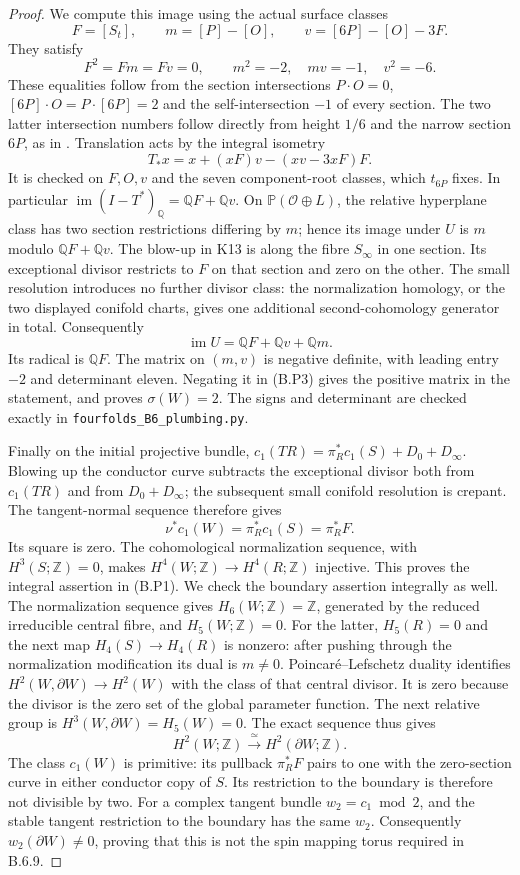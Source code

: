 \begin{proof}
We compute this image using the actual surface classes
\[
 F=[S_t],\qquad m=[P]-[O],\qquad
 v=[6P]-[O]-3F.
\]
They satisfy
\[
 F^2=Fm=Fv=0,
 \qquad m^2=-2,\quad mv=-1,\quad v^2=-6.
 \tag{B.P4}
\]
These equalities follow from the section intersections
$P\cdot O=0$, $[6P]\cdot O=P\cdot[6P]=2$ and the
self-intersection $-1$ of every section.  The two latter
intersection numbers follow directly from height $1/6$ and
the narrow section $6P$, as in \cite[Lemma 2.1]{mapsEngel}.
Translation acts by the integral isometry
\[
 T_*x=x+(xF)v-(xv-3xF)F.
\]
It is checked on $F,O,v$ and the seven component-root classes,
which $t_{6P}$ fixes.  In particular
$\operatorname{im}(I-T^*)_{\mathbb Q}=\mathbb QF+\mathbb Qv$.
On $\mathbb P(\mathcal O\oplus L)$, the relative hyperplane
class has two section restrictions differing by $m$; hence its
image under $U$ is $m$ modulo $\mathbb QF+\mathbb Qv$.
The blow-up in K13 is along the fibre $S_\infty$ in one section.
Its exceptional divisor restricts to $F$ on that section and zero
on the other.  The small resolution introduces no further divisor
class: the normalization homology, or the two displayed conifold
charts, gives one additional second-cohomology generator in total.
Consequently
\[
 \operatorname{im}U=\mathbb QF+\mathbb Qv+\mathbb Qm.
\]
Its radical is $\mathbb QF$.  The matrix on $(m,v)$ is negative
definite, with leading entry $-2$ and determinant eleven.
Negating it in (B.P3) gives the positive matrix in the statement,
and proves $\sigma(W)=2$.  The signs and determinant are checked
exactly in \texttt{fourfolds\_B6\_plumbing.py}.

Finally on the initial projective bundle,
$c_1(TR)=\pi_R^*c_1(S)+D_0+D_\infty$.
Blowing up the conductor curve subtracts the exceptional divisor
both from $c_1(TR)$ and from $D_0+D_\infty$; the subsequent small
conifold resolution is crepant.  The tangent-normal sequence
therefore gives
\[
 \nu^*c_1(W)=\pi_R^*c_1(S)=\pi_R^*F.
\]
Its square is zero.  The cohomological normalization sequence,
with $H^3(S;\mathbb Z)=0$, makes
$H^4(W;\mathbb Z)\to H^4(R;\mathbb Z)$ injective.
This proves the integral assertion in (B.P1).
We check the boundary assertion integrally as well.
The normalization sequence gives $H_6(W;\mathbb Z)=\mathbb Z$,
generated by the reduced irreducible central fibre, and
$H_5(W;\mathbb Z)=0$.  For the latter, $H_5(R)=0$ and the next
map $H_4(S)\to H_4(R)$ is nonzero: after pushing through the
normalization modification its dual is $m\ne0$.
Poincar\'e--Lefschetz duality identifies
$H^2(W,\partial W)\to H^2(W)$ with the class of that central
divisor.  It is zero because the divisor is the zero set of the
global parameter function.  The next relative group is
$H^3(W,\partial W)=H_5(W)=0$.  The exact sequence thus gives
\[
 H^2(W;\mathbb Z)\xrightarrow{\ \simeq\ }
 H^2(\partial W;\mathbb Z).
\]
The class $c_1(W)$ is primitive: its pullback $\pi_R^*F$ pairs
to one with the zero-section curve in either conductor copy of
$S$.  Its restriction to the boundary is therefore not divisible
by two.  For a complex tangent bundle $w_2=c_1\bmod2$, and the
stable tangent restriction to the boundary has the same $w_2$.
Consequently $w_2(\partial W)\ne0$, proving that this is not the
spin mapping torus required in B.6.9.


\end{proof}
